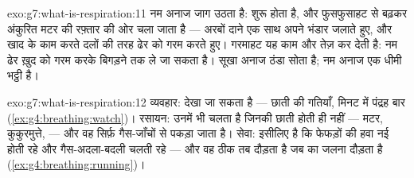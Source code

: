 \begin{solution}{exo:g7:what-is-respiration:11}
नम अनाज जाग उठता है:  शुरू होता है, और  फुसफुसाहट से बढ़कर
अंकुरित मटर की रफ़्तार की ओर चला जाता है --- अरबों दाने एक साथ अपने
भंडार जलाते हुए, और खाद के काम करते दलों की तरह ढेर को गरम करते हुए।
गरमाहट यह काम और तेज़ कर देती है: नम ढेर ख़ुद को गरम करके बिगड़ने तक ले
जा सकता है। सूखा अनाज ठंडा सोता है; नम अनाज एक धीमी भट्ठी है।
\end{solution}

\begin{solution}{exo:g7:what-is-respiration:12}
व्यवहार:  देखा जा सकता है --- छाती की गतियाँ, मिनट में
पंद्रह बार (\cref{ex:g4:breathing:watch})। रसायन:  उनमें भी चलता
है जिनकी छाती होती ही नहीं --- मटर, कुकुरमुत्ते,  --- और वह
सिर्फ़ गैस-जाँचों से पकड़ा जाता है। सेवा:  इसीलिए है कि
फेफड़ों की हवा नई होती रहे और गैस-अदला-बदली चलती रहे --- और वह ठीक तब
दौड़ता है जब  का जलना दौड़ता है
(\cref{ex:g4:breathing:running})।
\end{solution}

